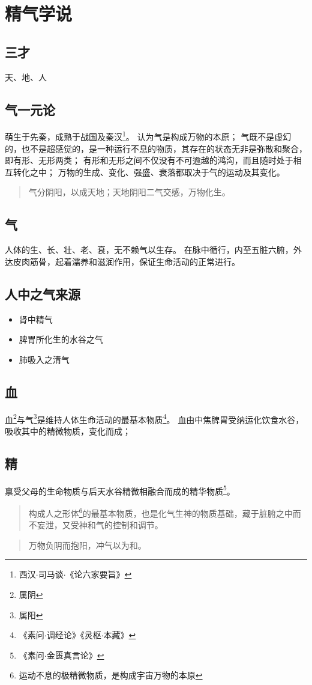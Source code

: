 \section{精气学说}

\subsection{三才}
天、地、人

\subsection{气一元论}
萌生于先秦，成熟于战国及秦汉\footnote{西汉$\cdot$司马谈$\cdot$《论六家要旨》}。
认为气是构成万物的本原；
气既不是虚幻的，也不是超感觉的，是一种运行不息的物质，其存在的状态无非是弥散和聚合，即有形、无形两类；
有形和无形之间不仅没有不可逾越的鸿沟，而且随时处于相互转化之中；
万物的生成、变化、强盛、衰落都取决于气的运动及其变化。
\begin{quote}
  气分阴阳，以成天地；天地阴阳二气交感，万物化生。
\end{quote}


\subsection{气}
人体的生、长、壮、老、衰，无不赖气以生存。
在脉中循行，内至五脏六腑，外达皮肉筋骨，起着濡养和滋润作用，保证生命活动的正常进行。

\subsection{人中之气来源}
\begin{itemize}
  \item 肾中精气
  \item 脾胃所化生的水谷之气
  \item 肺吸入之清气
\end{itemize}


\subsection{血}
血\footnote{属阴}与气\footnote{属阳}是维持人体生命活动的最基本物质\footnote{《素问$\cdot$调经论》《灵枢$\cdot$本藏》}。
血由中焦脾胃受纳运化饮食水谷，吸收其中的精微物质，变化而成；

\subsection{精}
禀受父母的生命物质与后天水谷精微相融合而成的精华物质\footnote{《素问$\cdot$金匮真言论》}。
\begin{quote}
  构成人之形体\footnote{运动不息的极精微物质，是构成宇宙万物的本原}的最基本物质，也是化气生神的物质基础，藏于脏腑之中而不妄泄，又受神和气的控制和调节。
\end{quote}
\begin{quote}
  万物负阴而抱阳，冲气以为和。
\end{quote}

